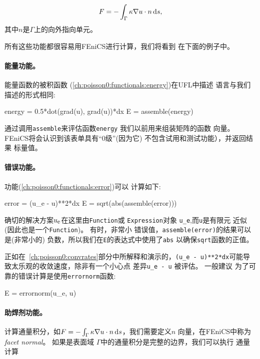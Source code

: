 \begin{equation}
F = -\int_\Gamma \kappa\nabla u\cdot n \ds,
\label{ch:poisson0:functionals:flux}
\end{equation}
其中$n$是$\Gamma$上的向外指向单元。

所有这些功能都很容易用FEniCS进行计算，我们将看到
在下面的例子中。


\paragraph{能量功能。}
能量函数的被积函数
(\ref{ch:poisson0:functionals:energy})在UFL中描述
语言与我们描述的形式相同:

\begin{python}
energy = 0.5*dot(grad(u), grad(u))*dx
E = assemble(energy)
\end{python}
通过调用\texttt{assemble}来评估函数\texttt{energy}
我们以前用来组装矩阵的函数
向量。 FEniCS将会认识到该表单具有“0级”(因为它)
不包含试用和测试功能），并返回结果
标量值。


\paragraph{错误功能。}
功能(\ref{ch:poisson0:functionals:error})可以
计算如下:

\begin{python}
error = (u_e - u)**2*dx
E = sqrt(abs(assemble(error)))
\end{python}
确切的解决方案$\uex$在这里由\texttt{Function}或
\texttt{Expression}对象
\verb!u_e!,而\texttt{u}是有限元
近似(因此也是一个\texttt{Function})。 有时，非常小
错误值，\texttt{assemble(error)}的结果可以是(非常小的)
负数，所以我们在\texttt{E}的表达式中使用了\texttt{abs}
以确保\texttt{sqrt}函数的正值。


正如在~\ref{ch:poisson0:convrates}部分中所解释和演示的，\verb!(u_e - u)**2*dx!可能导致太乐观的收敛速度，除非有一个小心点
差异\verb!u_e - u! 被评估。 一般建议
为了可靠的错误计算是使用\texttt{errornorm}函数:

\begin{python}
E = errornorm(u_e, u)
\end{python}


\paragraph{助焊剂功能。}
计算通量积分，如$F = -\int_\Gamma \kappa\nabla
u\cdot n \ds$，我们需要定义$n$
向量，在FEniCS中称为\emph{facet normal}。 如果是表面域
$\Gamma$中的通量积分是完整的边界，我们可以执行
通量计算

